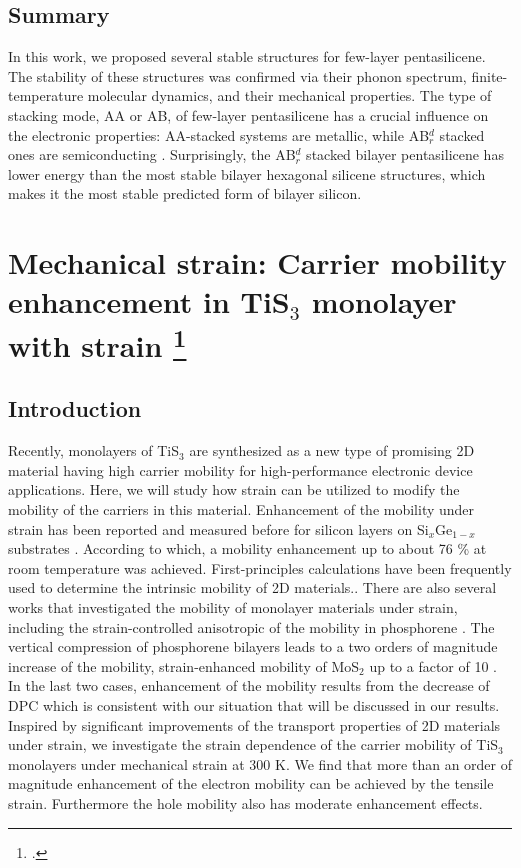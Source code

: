 \subsection{Summary}

In this work, we proposed several stable structures for few-layer pentasilicene. The stability of these structures was confirmed via their phonon spectrum, finite-temperature molecular dynamics, and their mechanical properties. The type of stacking mode, AA or AB, of few-layer pentasilicene has a crucial influence on the electronic properties: AA-stacked systems are metallic, while AB$_r^d$ stacked ones are semiconducting . Surprisingly, the AB$_r^d$ stacked bilayer pentasilicene has lower energy than the most stable bilayer hexagonal silicene structures, which makes it the most stable predicted form of bilayer silicon.  

\section[Mechanical strain: Carrier mobility enhancement in TiS$_3$ monolayer with strain]{Mechanical strain: Carrier mobility enhancement in TiS$_3$ monolayer with strain \footcite[This work is published:][]{Aierken2016.mobility} \label{mob_Tis3}}

\subsection{Introduction}

Recently, monolayers of TiS$_3$\cite{ADOM:ADOM201400043,ADMA:ADMA201405632} are synthesized as a new type of promising 2D material having high carrier mobility for high-performance electronic device applications. Here, we will study how strain can be utilized to modify the mobility of the carriers in this material. Enhancement of the mobility under strain has been reported and measured before for silicon layers on Si$_x$Ge$_{1-x}$ substrates \cite{Vogelsang1993,Welser1994}. According to which, a mobility enhancement up to about 76 \% at room temperature was achieved. First-principles calculations have been frequently used to determine the intrinsic mobility of 2D materials.\cite{Kaasbjerg2012,Zhang2014,Yongqing2014}. There are also several works that investigated the mobility of monolayer materials under strain\cite{fei,Henry2015,Sheng2015}, including the strain-controlled anisotropic of the mobility in phosphorene \cite{fei}. The vertical compression of phosphorene bilayers leads to a two orders of magnitude increase of the mobility\cite{Henry2015}, strain-enhanced mobility of MoS$_2$ up to a factor of 10 \cite{Sheng2015}. In the last two cases, enhancement of the mobility results from the decrease of DPC which is consistent with our situation that will be discussed in our results. Inspired by significant improvements of the transport properties of 2D materials under strain, we investigate the strain dependence of the carrier mobility of TiS$_3$ monolayers under mechanical strain at 300 K. We find that more than an order of magnitude enhancement of the electron mobility can be achieved by the tensile strain. Furthermore the hole mobility also has moderate enhancement effects.


